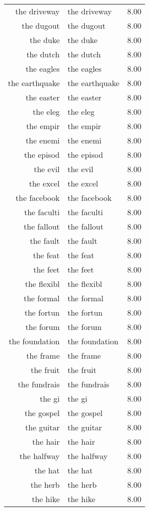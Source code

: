 \begin{table}[ht]
\begin{tabular}{rlr}
  the driveway & the driveway & 8.00 \\ 
  the dugout & the dugout & 8.00 \\ 
  the duke & the duke & 8.00 \\ 
  the dutch & the dutch & 8.00 \\ 
  the eagles & the eagles & 8.00 \\ 
  the earthquake & the earthquake & 8.00 \\ 
  the easter & the easter & 8.00 \\ 
  the eleg & the eleg & 8.00 \\ 
  the empir & the empir & 8.00 \\ 
  the enemi & the enemi & 8.00 \\ 
  the episod & the episod & 8.00 \\ 
  the evil & the evil & 8.00 \\ 
  the excel & the excel & 8.00 \\ 
  the facebook & the facebook & 8.00 \\ 
  the faculti & the faculti & 8.00 \\ 
  the fallout & the fallout & 8.00 \\ 
  the fault & the fault & 8.00 \\ 
  the feat & the feat & 8.00 \\ 
  the feet & the feet & 8.00 \\ 
  the flexibl & the flexibl & 8.00 \\ 
  the formal & the formal & 8.00 \\ 
  the fortun & the fortun & 8.00 \\ 
  the forum & the forum & 8.00 \\ 
  the foundation & the foundation & 8.00 \\ 
  the frame & the frame & 8.00 \\ 
  the fruit & the fruit & 8.00 \\ 
  the fundrais & the fundrais & 8.00 \\ 
  the gi & the gi & 8.00 \\ 
  the gospel & the gospel & 8.00 \\ 
  the guitar & the guitar & 8.00 \\ 
  the hair & the hair & 8.00 \\ 
  the halfway & the halfway & 8.00 \\ 
  the hat & the hat & 8.00 \\ 
  the herb & the herb & 8.00 \\ 
  the hike & the hike & 8.00 \\ 

\end{tabular}
\end{table}
